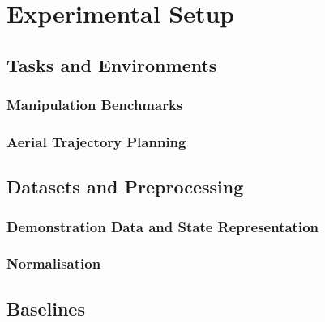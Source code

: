 \documentclass[headsepline,footsepline,footinclude=false,oneside,fontsize=11pt,paper=a4,listof=totoc,bibliography=totoc]{scrbook}
\begin{document}
\chapter{Experimental Setup}\label{ch:setup}

\section{Tasks and Environments}\label{sec:setup:envs}
\subsection{Manipulation Benchmarks}\label{sec:setup:envs:d3il}
\subsection{Aerial Trajectory Planning}\label{sec:setup:envs:uav}

\section{Datasets and Preprocessing}\label{sec:setup:data}
\subsection{Demonstration Data and State Representation}\label{sec:setup:data:state}
\subsection{Normalisation}\label{sec:setup:data:norm}

\section{Baselines}\label{sec:setup:baselines}
\end{document}
